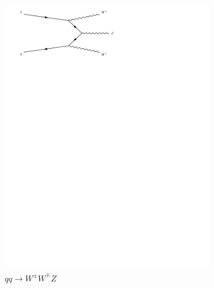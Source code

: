 \begin{figure}[h]
\begin{subfigure}[b]{0.3\textwidth}
    \includegraphics[trim={0.5cm 22cm 10cm 0cm},width=\textwidth]{../Diagrams/D10.pdf}
    \caption{$qq\rightarrow W^{\pm}W^{\mp}Z$}
    \label{fey:10}
  \end{subfigure}%
  ~
  \begin{subfigure}[b]{0.3\textwidth}

\end{subfigure}
\end{figure}
